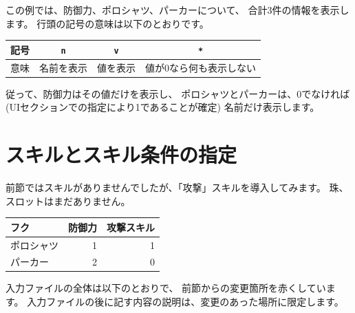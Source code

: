 \documentclass[dvipdfmx]{jsarticle}
\begin{document}
この例では、防御力、ポロシャツ、パーカーについて、
合計3件の情報を表示します。
行頭の記号の意味は以下のとおりです。
%
\begin{center}
\begin{tabular}{cccc}
\toprule
記号 & \texttt{n} &\texttt{v} & \texttt{*} \\
\midrule
意味 & 名前を表示 & 値を表示 & 値が0なら何も表示しない \\
\bottomrule
\end{tabular}
\end{center}
%
従って、防御力はその値だけを表示し、
ポロシャツとパーカーは、0でなければ
(UIセクションでの指定により1であることが確定) 名前だけ表示します。

\begin{center}
\end{center}

\section{スキルとスキル条件の指定} %
前節ではスキルがありませんでしたが、「攻撃」スキルを導入してみます。
珠、スロットはまだありません。

%
\begin{center}
\begin{tabular}{lrr}
\toprule
フク       & 防御力 & 攻撃スキル\\
\midrule
ポロシャツ & 1 & 1 \\
パーカー   & 2 & 0 \\
\bottomrule
\end{tabular}
\end{center}
%
入力ファイルの全体は以下のとおりで、
前節からの変更箇所を赤くしています。
入力ファイルの後に記す内容の説明は、変更のあった場所に限定します。
\medskip
\end{document}
